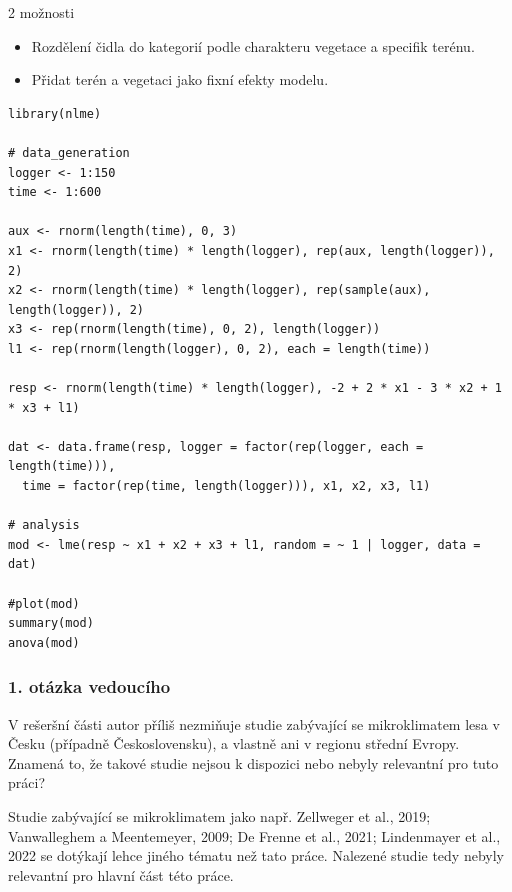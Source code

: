 \documentclass[
	11pt, %
]{beamer}
\begin{document}
\begin{frame}
	2 možnosti
	\begin{itemize}
		\item Rozdělení čidla do kategorií podle charakteru vegetace a specifik terénu.
		\item Přidat terén a vegetaci jako fixní efekty modelu.
	\end{itemize}
\end{frame}

\begin{frame}[fragile]
	\begin{lstlisting}[basicstyle=\tiny]
library(nlme)

# data_generation
logger <- 1:150
time <- 1:600

aux <- rnorm(length(time), 0, 3)
x1 <- rnorm(length(time) * length(logger), rep(aux, length(logger)), 2)
x2 <- rnorm(length(time) * length(logger), rep(sample(aux), length(logger)), 2)
x3 <- rep(rnorm(length(time), 0, 2), length(logger))
l1 <- rep(rnorm(length(logger), 0, 2), each = length(time))

resp <- rnorm(length(time) * length(logger), -2 + 2 * x1 - 3 * x2 + 1 * x3 + l1)

dat <- data.frame(resp, logger = factor(rep(logger, each = length(time))),
  time = factor(rep(time, length(logger))), x1, x2, x3, l1)

# analysis
mod <- lme(resp ~ x1 + x2 + x3 + l1, random = ~ 1 | logger, data = dat)

#plot(mod)
summary(mod)
anova(mod)
\end{lstlisting}
\end{frame}

\begin{frame}[plain] %
	\frametitle{1. otázka vedoucího}

V rešeršní části autor příliš nezmiňuje studie zabývající se mikroklimatem lesa v Česku (případně Československu), a vlastně ani v regionu střední Evropy. Znamená to, že takové studie nejsou k dispozici nebo nebyly relevantní pro tuto práci?

\end{frame}

\begin{frame}
	Studie zabývající se mikroklimatem jako např. Zellweger et al., 2019; Vanwalleghem a Meentemeyer, 2009; De Frenne et al., 2021; Lindenmayer et al., 2022 se dotýkají lehce jiného tématu než tato práce. Nalezené studie tedy nebyly relevantní pro hlavní část této práce.
\end{frame}
\end{document}

